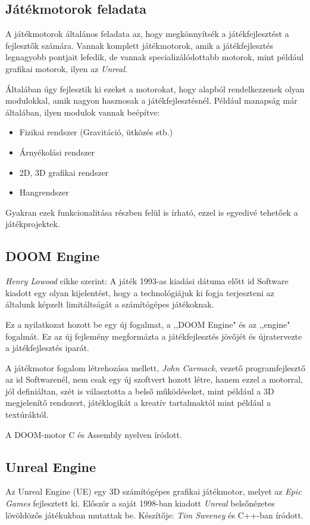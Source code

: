 \documentclass[]{thesis-ekf}
\theoremstyle{definition}
\begin{document}
	\subsection{Játékmotorok feladata}
	A játékmotorok általános feladata az, hogy megkönnyítsék a játékfejlesztést a fejlesztők számára. Vannak komplett játékmotorok, amik a játékfejlesztés legnagyobb pontjait lefedik, de vannak specializálódottabb motorok, mint például grafikai motorok, ilyen az \emph{Unreal}.
	
	Általában úgy fejlesztik ki ezeket a motorokat, hogy alapból rendelkezzenek olyan modulokkal, amik nagyon hasznosak a játékfejlesztésnél. Például manapság már általában, ilyen modulok vannak beépítve:
	
	\begin{itemize}
		\item Fizikai rendszer (Gravitáció, ütközés stb.)
		\item Árnyékolási rendszer
		\item 2D, 3D grafikai rendszer
		\item Hangrendszer
	\end{itemize}
	Gyakran ezek funkcionalitása részben felül is írható, ezzel is egyedivé tehetőek a játékprojektek.
	
	\subsection{DOOM Engine}
	\emph{Henry Lowood} cikke szerint:\cite{doomengine}
	A játék 1993-as kiadási dátuma előtt id Software kiadott egy olyan kijelentést, hogy a technológiájuk ki fogja terjeszteni az általunk képzelt limitáltságát a számítógépes játékoknak.
	
	Ez a nyilatkozat hozott be egy új fogalmat, a ,,DOOM Engine" és az ,,engine" fogalmát.
	Ez az új fejlemény megformázta a játékfejlesztés jövőjét és újratervezte a játékfejlesztés iparát.
	
	A játékmotor fogalom létrehozása mellett, \emph{John Carmack}, vezető programfejlesztő az id Softwarenél, nem csak egy új szoftvert hozott létre, hanem ezzel a motorral, jól definiáltan, szét is választotta a belső működéseket, mint például a 3D megjelenítő rendszert, játéklogikát a kreatív tartalmaktól mint például a textúráktól.
	
	A DOOM-motor C és Assembly nyelven íródott.
	
	\subsection{Unreal Engine}
	Az Unreal Engine (UE) egy 3D számítógépes grafikai játékmotor, melyet az \emph{Epic Games} fejlesztett ki. Először a saját 1998-ban kiadott \emph{Unreal} belsőnézetes lövöldözős játékukban mutattak be. Készítője: \emph{Tim Sweeney} és C++-ban íródott.
	
\end{document}
